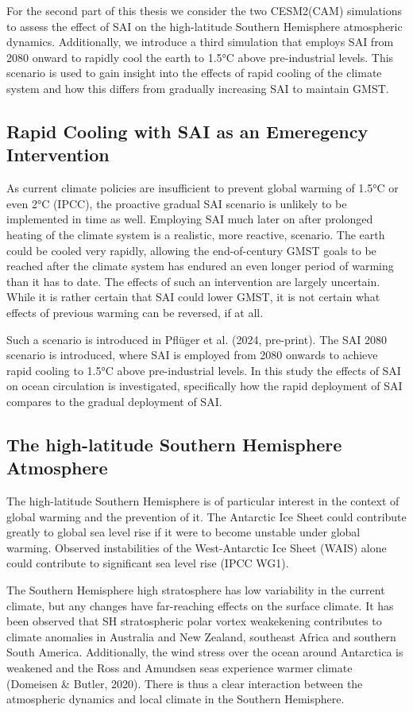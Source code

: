 For the second part of this thesis we consider the two CESM2(CAM) simulations to assess the effect of SAI on the high-latitude Southern Hemisphere atmospheric dynamics. Additionally, we introduce a third simulation that employs SAI from 2080 onward to rapidly cool the earth to 1.5°C above pre-industrial levels. This scenario is used to gain insight into the effects of rapid cooling of the climate system and how this differs from gradually increasing SAI to maintain GMST.

\subsection{Rapid Cooling with SAI as an Emeregency Intervention}
As current climate policies are insufficient to prevent global warming of 1.5°C or even 2°C (IPCC), the proactive gradual SAI scenario is unlikely to be implemented in time as well. Employing SAI much later on after prolonged heating of the climate system is a realistic, more reactive, scenario. The earth could be cooled very rapidly, allowing the end-of-century GMST goals to be reached after the climate system has endured an even longer period of warming than it has to date. The effects of such an intervention are largely uncertain. While it is rather certain that SAI could lower GMST, it is not certain what effects of previous warming can be reversed, if at all. 

Such a scenario is introduced in Pfl\"uger et al. (2024, pre-print). The SAI 2080 scenario is introduced, where SAI is employed from 2080 onwards to achieve rapid cooling to 1.5°C above pre-industrial levels. In this study the effects of SAI on ocean circulation is investigated, specifically how the rapid deployment of SAI compares to the gradual deployment of SAI. 

\subsection{The high-latitude Southern Hemisphere Atmosphere}
The high-latitude Southern Hemisphere is of particular interest in the context of global warming and the prevention of it. The Antarctic Ice Sheet could contribute greatly to global sea level rise if it were to become unstable under global warming. Observed instabilities of the West-Antarctic Ice Sheet (WAIS) alone could contribute to significant sea level rise (IPCC WG1). 

The Southern Hemisphere high stratosphere has low variability in the current climate, but any changes have far-reaching effects on the surface climate.  It has been observed that SH stratospheric polar vortex weakekening contributes to climate anomalies in Australia and New Zealand, southeast Africa and southern South America. Additionally, the wind stress over the ocean around Antarctica is weakened and the Ross and Amundsen seas experience warmer climate (Domeisen \& Butler, 2020). There is thus a clear interaction between the atmospheric dynamics and local climate in the Southern Hemisphere. 


